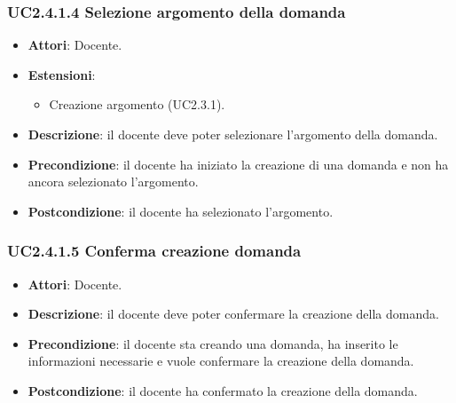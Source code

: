 \subsubsection{UC2.4.1.4 Selezione argomento della domanda}
\begin{itemize}
\item \textbf{Attori}: Docente.
\item \textbf{Estensioni}:
\begin{itemize}
\item Creazione argomento (UC2.3.1).
\end{itemize}
\item \textbf{Descrizione}: il docente deve poter selezionare l'argomento della domanda.
\item \textbf{Precondizione}: il docente ha iniziato la creazione di una domanda e non ha ancora selezionato l'argomento.
\item \textbf{Postcondizione}: il docente ha selezionato l'argomento.
\end{itemize}
\subsubsection{UC2.4.1.5 Conferma creazione domanda}
\begin{itemize}
\item \textbf{Attori}: Docente.
\item \textbf{Descrizione}: il docente deve poter confermare la creazione della domanda.
\item \textbf{Precondizione}: il docente sta creando una domanda, ha inserito le informazioni necessarie e vuole confermare la creazione della domanda.
\item \textbf{Postcondizione}: il docente ha confermato la creazione della domanda.
\end{itemize}
